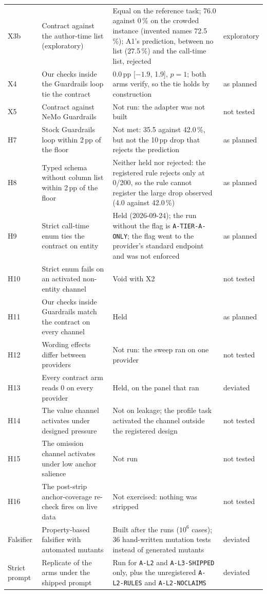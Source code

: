 \documentclass[journal]{IEEEtran}
\begin{document}
\begin{table}[!tp]
\begin{tabular}{@{}lp{5.4cm}p{8.9cm}l@{}}
X3b & Contract against the author-time list (exploratory) & Equal on the reference task; 76.0 against 0\,\% on the crowded instance (invented names 72.5\,\%); A1's prediction, between no list (27.5\,\%) and the call-time list, rejected & exploratory \\
X4 & Our checks inside the Guardrails loop tie the contract & 0.0\,pp [$-1.9$, 1.9], $p=1$; both arms verify, so the tie holds by construction & as planned \\
X5 & Contract against NeMo Guardrails & Not run: the adapter was not built & not tested \\
H7 & Stock Guardrails loop within 2\,pp of the floor & Not met: 35.5 against 42.0\,\%, but not the 10\,pp drop that rejects the prediction & as planned \\
H8 & Typed schema without column list within 2\,pp of the floor & Neither held nor rejected: the registered rule rejects only at 0/200, so the rule cannot register the large drop observed (4.0 against 42.0\,\%) & as planned \\
H9 & Strict call-time enum ties the contract on entity & Held (2026-09-24); the run without the flag is \texttt{A-TIER-A-ONLY}; the flag went to the provider's standard endpoint and was not enforced & as planned \\
H10 & Strict enum fails on an activated non-entity channel & Void with X2 & not tested \\
H11 & Our checks inside Guardrails match the contract on every channel & Held & as planned \\
H12 & Wording effects differ between providers & Not run: the sweep ran on one provider & not tested \\
H13 & Every contract arm reads 0 on every provider & Held, on the panel that ran & deviated \\
H14 & The value channel activates under designed pressure & Not on leakage; the profile task activated the channel outside the registered design & not tested \\
H15 & The omission channel activates under low anchor salience & Not run & not tested \\
H16 & The post-strip anchor-coverage re-check fires on live data & Not exercised: nothing was stripped & not tested \\
\midrule
Falsifier & Property-based falsifier with automated mutants & Built after the runs ($10^6$ cases); 36 hand-written mutation tests instead of generated mutants & deviated \\
Strict prompt & Replicate of the arms under the shipped prompt & Run for \texttt{A-L2} and \texttt{A-L3-SHIPPED} only, plus the unregistered \texttt{A-L2-RULES} and \texttt{A-L2-NOCLAIMS} & deviated \\

\end{tabular}
\end{table}
\end{document}
